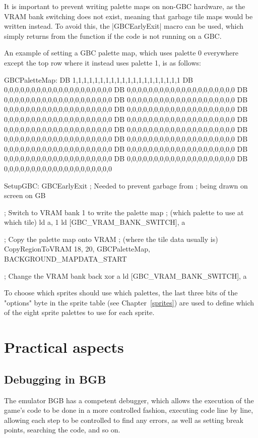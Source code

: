 \documentclass[11pt]{book}
\begin{document}
It is important to prevent writing palette maps on non-GBC hardware, as the VRAM bank switching does not exist, meaning that garbage tile maps would be written instead. To avoid this, the |GBCEarlyExit| macro can be used, which simply returns from the function if the code is not running on a GBC.

An example of setting a GBC palette map, which uses palette 0 everywhere except the top row where it instead uses palette 1, is as follows:

\begin{code}
GBCPaletteMap:
DB 1,1,1,1,1,1,1,1,1,1,1,1,1,1,1,1,1,1,1,1
DB 0,0,0,0,0,0,0,0,0,0,0,0,0,0,0,0,0,0,0,0
DB 0,0,0,0,0,0,0,0,0,0,0,0,0,0,0,0,0,0,0,0
DB 0,0,0,0,0,0,0,0,0,0,0,0,0,0,0,0,0,0,0,0
DB 0,0,0,0,0,0,0,0,0,0,0,0,0,0,0,0,0,0,0,0
DB 0,0,0,0,0,0,0,0,0,0,0,0,0,0,0,0,0,0,0,0
DB 0,0,0,0,0,0,0,0,0,0,0,0,0,0,0,0,0,0,0,0
DB 0,0,0,0,0,0,0,0,0,0,0,0,0,0,0,0,0,0,0,0
DB 0,0,0,0,0,0,0,0,0,0,0,0,0,0,0,0,0,0,0,0
DB 0,0,0,0,0,0,0,0,0,0,0,0,0,0,0,0,0,0,0,0
DB 0,0,0,0,0,0,0,0,0,0,0,0,0,0,0,0,0,0,0,0
DB 0,0,0,0,0,0,0,0,0,0,0,0,0,0,0,0,0,0,0,0
DB 0,0,0,0,0,0,0,0,0,0,0,0,0,0,0,0,0,0,0,0
DB 0,0,0,0,0,0,0,0,0,0,0,0,0,0,0,0,0,0,0,0
DB 0,0,0,0,0,0,0,0,0,0,0,0,0,0,0,0,0,0,0,0
DB 0,0,0,0,0,0,0,0,0,0,0,0,0,0,0,0,0,0,0,0
DB 0,0,0,0,0,0,0,0,0,0,0,0,0,0,0,0,0,0,0,0
DB 0,0,0,0,0,0,0,0,0,0,0,0,0,0,0,0,0,0,0,0

SetupGBC:
    GBCEarlyExit ; Needed to prevent garbage from 
    ; being drawn on screen on GB
    
    ; Switch to VRAM bank 1 to write the palette map 
    ; (which palette to use at which tile)
    ld a, 1
    ld [GBC_VRAM_BANK_SWITCH], a
    
    ; Copy the palette map onto VRAM
    ; (where the tile data usually is)
    CopyRegionToVRAM 18, 20, GBCPaletteMap, 
    	BACKGROUND_MAPDATA_START
    
    ; Change the VRAM bank back
    xor a
    ld [GBC_VRAM_BANK_SWITCH], a 
\end{code}

To choose which sprites should use which palettes, the last three bits of the "options" byte in the sprite table (see Chapter~\ref{sprites}) are used to define which of the eight sprite palettes to use for each sprite. 

\chapter{Practical aspects} 

\section{Debugging in BGB}
\label{debug}
The emulator BGB has a competent debugger, which allows the execution of the game's code to be done in a more controlled fashion, executing code line by line, allowing each step to be controlled to find any errors, as well as setting break points, searching the code, and so on. 
\end{document}
